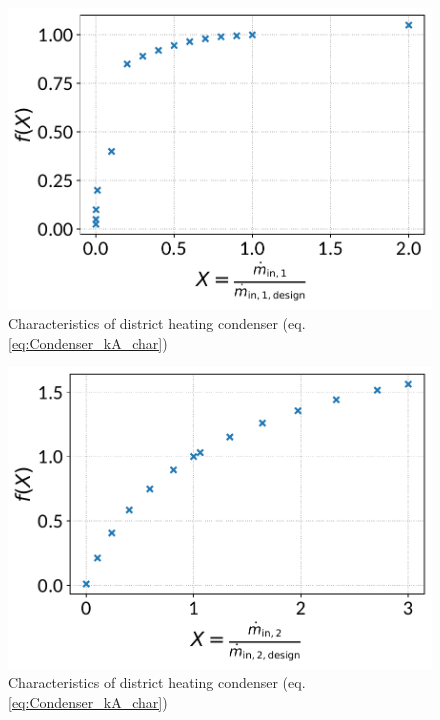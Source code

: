 \begin{minipage}{0.5\textwidth}
\begin{figure}[H]\begin{center}
\includegraphics[width=\textwidth]{figures/Condenser_CharLine_kA_char1_district_heating_condenser.pdf}
\caption{Characteristics of district heating condenser (eq. \ref{eq:Condenser_kA_char})}
\label{fig:CharLine_kA_char1_district heating condenser}
\end{center}\end{figure}

\end{minipage}
\begin{minipage}{0.5\textwidth}
\begin{figure}[H]\begin{center}
\includegraphics[width=\textwidth]{figures/Condenser_CharLine_kA_char2_district_heating_condenser.pdf}
\caption{Characteristics of district heating condenser (eq. \ref{eq:Condenser_kA_char})}
\label{fig:CharLine_kA_char2_district heating condenser}
\end{center}\end{figure}

\end{minipage}

